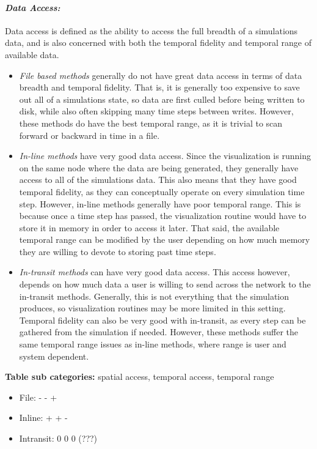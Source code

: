 \paragraph{\emph{Data Access:}}
Data access is defined as the ability to access the full breadth of a simulations data, and is also concerned with both the temporal fidelity and temporal range of available data.
\begin{itemize}
    \item \emph{File based methods} generally do not have great data access in terms of data breadth and temporal fidelity. That is, it is generally too expensive to save out all of a simulations state, so data are first culled before being written to disk, while also often skipping many time steps between writes. However, these methods do have the best temporal range, as it is trivial to scan forward or backward in time in a file.
    
    \item \emph{In-line methods} have very good data access. Since the visualization is running on the same node where the data are being generated, they generally have access to all of the simulations data. This also means that they have good temporal fidelity, as they can conceptually operate on every simulation time step. However, in-line methods generally have poor temporal range. This is because once a time step has passed, the visualization routine would have to store it in memory in order to access it later. That said, the available temporal range can be modified by the user depending on how much memory they are willing to devote to storing past time steps. 
    
    \item \emph{In-transit methods} can have very good data access. This access however, depends on how much data a user is willing to send across the network to the in-transit methods. Generally, this is not everything that the simulation produces, so visualization routines may be more limited in this setting. Temporal fidelity can also be very good with in-transit, as every step can be gathered from the simulation if needed. However, these methods suffer the same temporal range issues as in-line methods, where range is user and system dependent.
\end{itemize}
\textbf{Table sub categories:} spatial access, temporal access, temporal range
\begin{itemize}
    \item File: - - +
    \item Inline: + + -
    \item Intransit: 0 0 0 (???)
\end{itemize}

